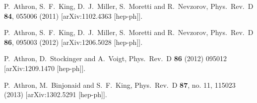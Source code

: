 \documentclass[final,3p,11pt,pdflatex]{elsarticle}
\begin{document}
\begin{thebibliography}{100}
  P.~Athron, S.~F.~King, D.~J.~Miller, S.~Moretti and R.~Nevzorov,
  Phys.\ Rev.\ D {\bf 84}, 055006 (2011)
  [arXiv:1102.4363 [hep-ph]].

  
  P.~Athron, S.~F.~King, D.~J.~Miller, S.~Moretti and R.~Nevzorov,
  Phys.\ Rev.\ D {\bf 86}, 095003 (2012)
  [arXiv:1206.5028 [hep-ph]].

  P.~Athron, D.~Stockinger and A.~Voigt,
  Phys.\ Rev.\ D {\bf 86} (2012) 095012
  [arXiv:1209.1470 [hep-ph]].

  P.~Athron, M.~Binjonaid and S.~F.~King,
  Phys.\ Rev.\ D {\bf 87}, no. 11, 115023 (2013)
  [arXiv:1302.5291 [hep-ph]].

\end{thebibliography}
\end{document}
